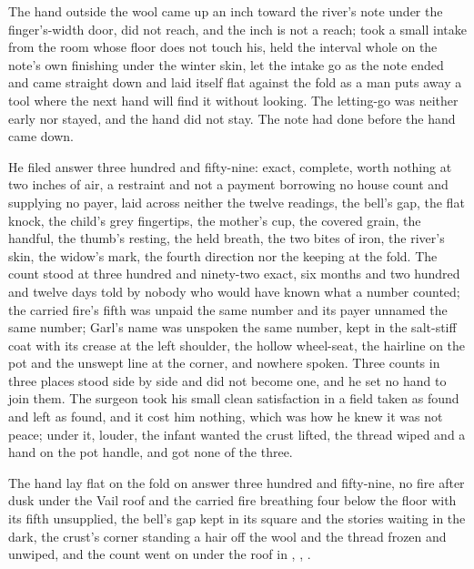 The hand outside the wool came up an inch toward the river's note under the finger's-width door, did not reach, and the inch is not a reach; took a small intake from the room whose floor does not touch his, held the interval whole on the note's own finishing under the winter skin, let the intake go as the note ended and came straight down and laid itself flat against the fold as a man puts away a tool where the next hand will find it without looking. The letting-go was neither early nor stayed, and the hand did not stay. The note had done before the hand came down.

He filed answer three hundred and fifty-nine: exact, complete, worth nothing at two inches of air, a restraint and not a payment borrowing no house count and supplying no payer, laid across neither the twelve readings, the bell's gap, the flat knock, the child's grey fingertips, the mother's cup, the covered grain, the handful, the thumb's resting, the held breath, the two bites of iron, the river's skin, the widow's mark, the fourth direction nor the keeping at the fold. The count stood at three hundred and ninety-two exact, six months and two hundred and twelve days told by nobody who would have known what a number counted; the carried fire's fifth was unpaid the same number and its payer unnamed the same number; Garl's name was unspoken the same number, kept in the salt-stiff coat with its crease at the left shoulder, the hollow wheel-seat, the hairline on the pot and the unswept line at the corner, and nowhere spoken. Three counts in three places stood side by side and did not become one, and he set no hand to join them. The surgeon took his small clean satisfaction in a field taken as found and left as found, and it cost him nothing, which was how he knew it was not peace; under it, louder, the infant wanted the crust lifted, the thread wiped and a hand on the pot handle, and got none of the three.

The hand lay flat on the fold on answer three hundred and fifty-nine, no fire after dusk under the Vail roof and the carried fire breathing four below the floor with its fifth unsupplied, the bell's gap kept in its square and the stories waiting in the dark, the crust's corner standing a hair off the wool and the thread frozen and unwiped, and the count went on under the roof in , , .
